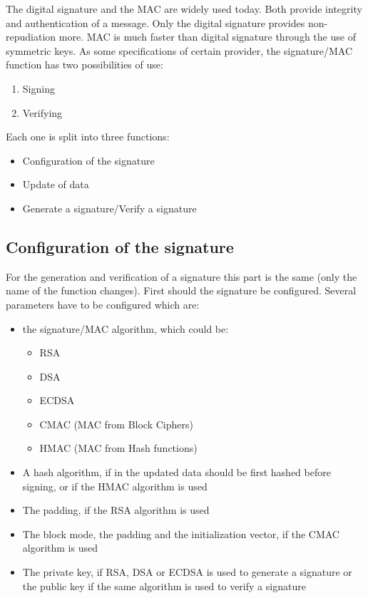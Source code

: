 The digital signature and the MAC are widely used today. Both provide integrity
and authentication of a message. Only the digital signature provides
non-repudiation more. MAC is much faster than digital signature through the use
of symmetric keys.
As some specifications of certain provider, the signature/MAC function has two
possibilities of use:
\begin{enumerate}[noitemsep]
  \item Signing
  \item Verifying\newline
\end{enumerate}

Each one is split into three functions:
\begin{itemize}[noitemsep]
  \item Configuration of the signature
  \item Update of data
  \item Generate a signature/Verify a signature\newline
\end{itemize}


\subsection*{Configuration of the signature}
For the generation and verification of a signature this part is the same (only
the name of the function changes).
First should the signature be configured.
Several parameters have to be configured which are:
\begin{itemize}
  \item the signature/MAC algorithm, which could be:
  \begin{itemize}[noitemsep]
    \item RSA
    \item DSA
    \item ECDSA
    \item CMAC (MAC from Block Ciphers)
    \item HMAC (MAC from Hash functions)
  \end{itemize}
  \item A hash algorithm, if in the updated data should be first hashed before
  signing, or if the HMAC algorithm is used
  \item The padding, if the RSA algorithm is used
  \item The block mode, the padding and the initialization vector, if the CMAC
  algorithm is used
  \item The private key, if RSA, DSA or ECDSA is used to generate a signature or
  the public key if the same algorithm is used to verify a signature
\end{itemize}

